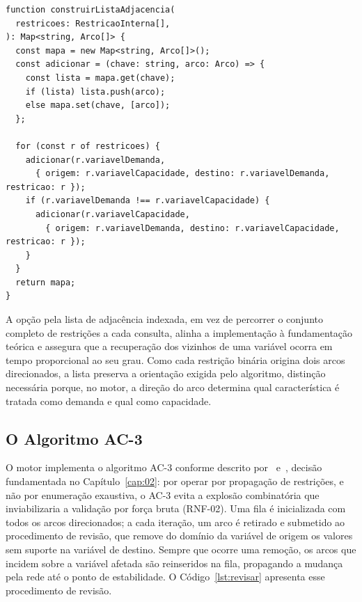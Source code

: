 \begin{lstlisting}[caption={Construção da lista de adjacência do grafo de restrições},label={lst:lista-adjacencia},basicstyle=\ttfamily\small]
function construirListaAdjacencia(
  restricoes: RestricaoInterna[],
): Map<string, Arco[]> {
  const mapa = new Map<string, Arco[]>();
  const adicionar = (chave: string, arco: Arco) => {
    const lista = mapa.get(chave);
    if (lista) lista.push(arco);
    else mapa.set(chave, [arco]);
  };

  for (const r of restricoes) {
    adicionar(r.variavelDemanda,
      { origem: r.variavelCapacidade, destino: r.variavelDemanda, restricao: r });
    if (r.variavelDemanda !== r.variavelCapacidade) {
      adicionar(r.variavelCapacidade,
        { origem: r.variavelDemanda, destino: r.variavelCapacidade, restricao: r });
    }
  }
  return mapa;
}
\end{lstlisting}

A opção pela lista de adjacência indexada, em vez de percorrer o conjunto completo de restrições a cada consulta, alinha a implementação à fundamentação teórica e assegura que a recuperação dos vizinhos de uma variável ocorra em tempo proporcional ao seu grau. Como cada restrição binária origina dois arcos direcionados, a lista preserva a orientação exigida pelo algoritmo, distinção necessária porque, no motor, a direção do arco determina qual característica é tratada como demanda e qual como capacidade.

\subsection{O Algoritmo AC-3}
\label{sub:impl-ac3}
O motor implementa o algoritmo AC-3 conforme descrito por~\textcite{Mackworth1977} e~\textcite{Russell2010}, decisão fundamentada no Capítulo~\ref{cap:02}: por operar por propagação de restrições, e não por enumeração exaustiva, o AC-3 evita a explosão combinatória que inviabilizaria a validação por força bruta (RNF-02). Uma fila é inicializada com todos os arcos direcionados; a cada iteração, um arco é retirado e submetido ao procedimento de revisão, que remove do domínio da variável de origem os valores sem suporte na variável de destino. Sempre que ocorre uma remoção, os arcos que incidem sobre a variável afetada são reinseridos na fila, propagando a mudança pela rede até o ponto de estabilidade. O Código~\ref{lst:revisar} apresenta esse procedimento de revisão.


